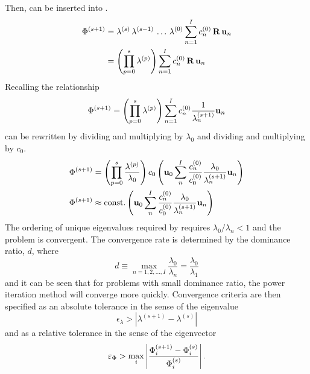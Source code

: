     Then,  can be inserted into
    .
    \begin{align}
      \Phi^{(s+1)} &= \lambda^{(s)} \, \lambda^{(s-1)} \, \ldots \, 
        \lambda^{(0)} \sum_{n=1}^I c_n^{(0)} \, \mathbf{R} \, \mathbf{u}_n \\
      &= \left( \prod_{p=0}^{s} \lambda^{(p)} \right) \sum_{n=1}^I c_n^{(0)} \, 
        \mathbf{R} \, \mathbf{u}_n
    \end{align}
    Recalling the relationship 
    \begin{equation}
      \label{eq:phi_expand_above}
      \Phi^{(s+1)} = \left( \prod_{p=0}^s \lambda^{(p)} \right) 
        \sum_{n=1}^I c_n^{(0)} \frac{1}{\lambda_n^{(s+1)}} \mathbf{u}_n
    \end{equation}
     can be rewritten by dividing and multiplying by
    $\lambda_0$ and dividing and multiplying by $c_0$.
    \begin{align}
      \Phi^{(s+1)} &= \left( \prod_{p=0}^s \frac{\lambda^{(p)}}{\lambda_0} 
        \right) c_0 \left( \mathbf{u}_0 \sum_n^I \frac{c_n^{(0)}}{c_0^{(0)}}
        \frac{\lambda_0}{\lambda_n^{(s+1)}} \mathbf{u}_n \right) \\
      \label{eq:eigen_phi_converge}
      \Phi^{(s+1)} &\approx \text{const.} \left( 
        \mathbf{u}_0 \sum_n^I \frac{c_n^{(0)}}{c_0^{(0)}}
        \frac{\lambda_0}{\lambda_n^{(s+1)}} \mathbf{u}_n \right)
    \end{align}
    The ordering of unique eigenvalues required by  
    requires $\lambda_0 / \lambda_n < 1$ and the problem is convergent.  The 
    convergence rate is determined by the dominance ratio, $d$, where
    \begin{equation}
      \label{eq:dominance_ratio}
      d \equiv \max_{n=1,2,\ldots,I} \frac{\lambda_0}{\lambda_n} =
        \frac{\lambda_0}{\lambda_1}
    \end{equation}
    and it can be seen that for problems with small dominance ratio, the power
    iteration method will converge more quickly. Convergence criteria are then
    specified as an absolute tolerance in the sense of the eigenvalue
    \begin{equation}
      \label{eq:eigenvalue_tol}
      \epsilon_{\lambda} > | \lambda^{(s+1)} - \lambda^{(s)} |
    \end{equation}
    and as a relative tolerance in the sense of the eigenvector
    \begin{equation}
      \label{eq:eigenvector_tol}
      \varepsilon_{\Phi} > \max_i \left| \frac{\Phi_i^{(s+1)} - \Phi_i^{(s)}}
        {\Phi_i^{(s)}}\right| .
    \end{equation}

